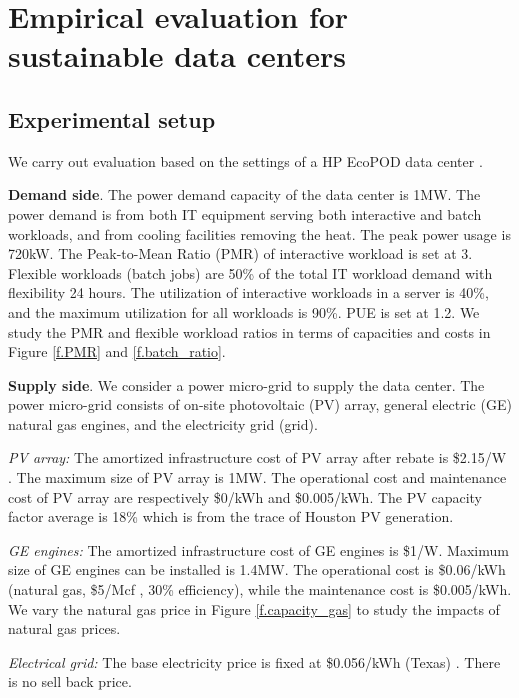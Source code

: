 \section{Empirical evaluation for sustainable data centers}
\label{sec:sustainableDataCenters}

\subsection{Experimental setup}
\label{sec:setup}

We carry out evaluation based on the settings of a HP EcoPOD data center \cite{hpEcoPODs}.

\textbf{Demand side}. The power demand capacity of the data center is 1MW. 
The power demand is from both IT equipment serving both interactive and batch workloads, and from cooling facilities removing the heat. The peak power usage is 720kW. The Peak-to-Mean Ratio (PMR) of interactive workload is set at 3. Flexible workloads (batch jobs) are 50\% of the total IT workload demand with flexibility 24 hours. The utilization of interactive workloads in a server is 40\%, and the maximum utilization for all workloads is 90\%. PUE is set at 1.2. We study the PMR and flexible workload ratios in terms of capacities and costs in Figure \ref{f.PMR} and \ref{f.batch_ratio}.

\textbf{Supply side}. We consider a power micro-grid to supply the data center. The power micro-grid consists of on-site photovoltaic (PV) array, general electric (GE) natural gas engines, and the electricity grid (grid). 

\emph{PV array:} The amortized infrastructure cost of PV array after rebate is \$2.15/W \cite{solarCost}. The maximum size of PV array is 1MW.  The operational cost and maintenance cost of PV array are respectively \$0/kWh and \$0.005/kWh. The PV capacity factor average is 18\% which is from the trace of Houston PV generation.

\emph{GE engines:} The amortized infrastructure cost of GE engines is \$1/W. Maximum size of GE engines can be installed is 1.4MW. The operational cost is \$0.06/kWh (natural gas, \$5/Mcf \cite{gasPrice}, 30\% efficiency), while the maintenance cost is \$0.005/kWh. We vary the natural gas price in Figure \ref{f.capacity_gas} to study the impacts of natural gas prices.

\emph{Electrical grid:} The base electricity price is fixed at \$0.056/kWh (Texas) \cite{electricityRateTexas}. There is no sell back price. 

